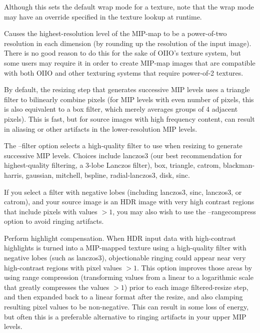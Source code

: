 Although this sets the default wrap mode for a texture, note that
the wrap mode may have an override specified in the texture lookup
at runtime.
\apiend

Causes the highest-resolution level of the MIP-map to be a
power-of-two resolution in each dimension
(by rounding up the resolution of the input image).  There is no
good reason to do this for the sake of OIIO's texture system, but 
some users may require it in order to create MIP-map images
that are compatible with both OIIO and other texturing systems that
require power-of-2 textures.
\apiend

By default, the resizing step that generates successive MIP levels
uses a triangle filter to bilinearly combine pixels (for MIP levels
with even number of pixels, this is also equivalent to a box filter,
which merely averages groups of 4 adjacent pixels).  This is fast,
but for source images with high frequency content, can result in 
aliasing or other artifacts in the lower-resolution MIP levels.

The {\cf --filter} option selects a high-quality filter to use when
resizing to generate successive MIP levels.  Choices include
{\cf lanczos3} (our best recommendation for highest-quality filtering, a
3-lobe Lanczos filter), {\cf box}, {\cf triangle}, {\cf catrom},
{\cf blackman-harris}, {\cf gaussian}, {\cf mitchell}, {\cf bspline},
{\cf radial-lanczos3}, {\cf disk}, {\cf sinc}.

If you select a filter with negative lobes (including
{\cf lanczos3}, {\cf sinc}, {\cf lanczos3}, or {\cf catrom}), and your
source image is an HDR image with very high contrast regions that
include pixels with values $>1$, you may also wish to use the
{\cf --rangecompress} option to avoid ringing artifacts.
\apiend

Perform highlight compensation.  When HDR input data with high-contrast
highlights is turned into a MIP-mapped texture using a high-quality
filter with negative lobes (such as {\cf lanczos3}), objectionable
ringing could appear near very high-contrast regions with pixel values
$>1$. This option improves those areas by using range compression
(transforming values from a linear to a logarithmic scale that greatly
compresses the values $> 1$) prior to each
image filtered-resize step, and then expanded back to a linear format
after the resize, and also clamping resulting pixel values to be
non-negative.  This can result in some loss of energy, but often this is
a preferable alternative to ringing artifacts in your upper MIP levels.
\apiend

